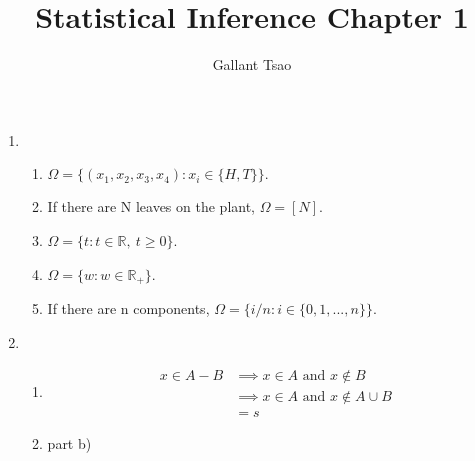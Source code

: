 \documentclass{article}
\title{Statistical Inference Chapter 1}
\author{Gallant Tsao}
\begin{document}
\maketitle

\begin{enumerate}
    \item \begin{enumerate}
        \item $\Omega = \{(x_1, x_2, x_3, x_4): x_i \in \{H, T\}\}.$
        \item If there are N leaves on the plant, $\Omega = [N]$.
        \item $\Omega = \{t: t \in \mathbb{R},\ t \geq 0\}$.
        \item $\Omega = \{w: w \in \mathbb{R}_{+}\}$.
        \item If there are n components, $\Omega = \{i/n: i \in \{0, 1, ..., n\}\}$.
    \end{enumerate}

    \item \begin{enumerate}
        \item \begin{align*}
            x \in A-B 
            &\implies x \in A \text{ and } x \notin B \\
            &\implies x \in A \text{ and } x \notin A \cup B \\
            &= s
        \end{align*}

        \item part b)
    \end{enumerate}
\end{enumerate}
\end{document}
